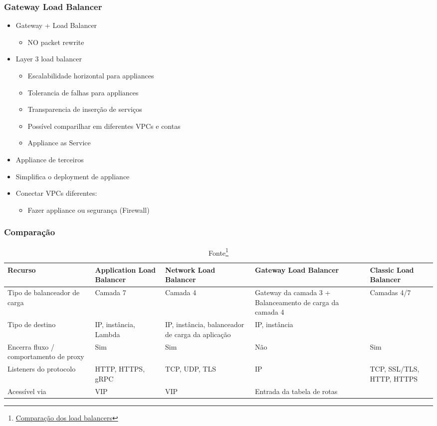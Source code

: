\begin{frame}
	\frametitle{Gateway Load Balancer}
	\begin{itemize}
		\item Gateway + Load Balancer
			\begin{itemize}
				\item NO packet rewrite
			\end{itemize}
		\item Layer 3 load balancer
			\begin{itemize}
				\item Escalabilidade horizontal para appliances
				\item Tolerancia de falhas para appliances
				\item Transparencia de inserção de serviços
				\item Possível comparilhar em diferentes VPCs e contas
				\item Appliance as Service
			\end{itemize}
		\item Appliance de terceiros
		\item Simplifica o deployment de appliance
		\item Conectar VPCs diferentes:
			\begin{itemize}
				\item Fazer appliance ou segurança (Firewall)
			\end{itemize}
	\end{itemize}
\end{frame}

\begin{frame}
	\frametitle{Comparação}
	\begin{tiny}
	\begin{table}[htpb]
		\centering
		\caption{Fonte\footnote{\href{https://aws.amazon.com/pt/elasticloadbalancing/features/\#Product_comparisons}{Comparação dos load balancers}}}
	
		\begin{tabular}{|p{2cm}|p{2cm}|p{2cm}|p{2cm}|p{2cm}|}
			\hline
			Recurso & Application Load Balancer & Network Load Balancer & Gateway Load Balancer & Classic Load Balancer \\
			\hline \hline
			Tipo de balanceador de carga & Camada 7 & Camada 4 & Gateway da camada 3 + Balanceamento de carga da camada 4 & Camadas 4/7 \\
			\hline
			Tipo de destino & IP, instância, Lambda & IP, instância, balanceador de carga da aplicação & IP, instância & \\
			\hline
			Encerra fluxo / comportamento de proxy & Sim & Sim & Não & Sim \\
			\hline
			Listeners do protocolo & HTTP, HTTPS, gRPC & TCP, UDP, TLS & IP & TCP, SSL/TLS, HTTP, HTTPS \\
			\hline
			Acessível via & VIP & VIP & Entrada da tabela de rotas & \\
			\hline
		\end{tabular}
	\end{table}
	\end{tiny}
\end{frame}
